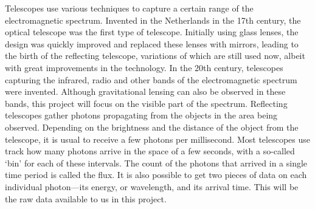 \documentclass[10pt,a4paper]{article}
\begin{document}
\par Telescopes use various techniques to capture a certain range of the electromagnetic spectrum. Invented in the Netherlands in the 17th century, the optical telescope was the first type of telescope. Initially using glass lenses, the design was quickly improved and replaced these lenses with mirrors, leading to the birth of the reflecting telescope, variations of which are still used now, albeit with great improvements in the technology. In the 20th century, telescopes capturing the infrared, radio and other bands of the electromagnetic spectrum were invented. Although gravitational lensing can also be observed in these bands, this project will focus on the visible part of the spectrum. Reflecting telescopes gather photons propagating from the objects in the area being observed. Depending on the brightness and the distance of the object from the telescope, it is usual to receive a few photons per millisecond. Most telescopes use track how many photons arrive in the space of a few seconds, with a so-called `bin' for each of these intervals. The count of the photons that arrived in a single time period is called the flux. It is also possible to get two pieces of data on each individual photon---its energy, or wavelength, and its arrival time. This will be the raw data available to us in this project.
\end{document}
